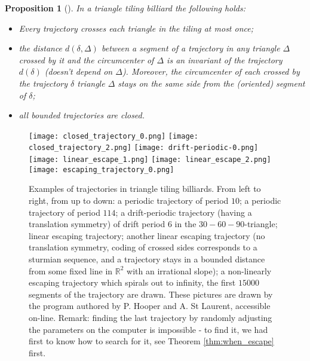 \documentclass[12pt]{article}
\newtheorem{proposition}{Proposition}
\theoremstyle{definition}
\begin{document}
\begin{proposition}[\cite{BDFI18}]\label{prop:Dianacomeback}
In a triangle tiling billiard the following holds:
\begin{itemize}
\item[1.] Every trajectory crosses each triangle in the tiling at most once;
\item[2.] the distance $d(\delta, \Delta)$ between a segment of a trajectory in any triangle $\Delta$ crossed by it and the circumcenter of $\Delta$ is an invariant of the trajectory $d(\delta)$ (doesn't depend on $\Delta$). Moreover, the circumcenter of each crossed by the trajectory $\delta$ triangle $\Delta$ stays on the same side from the (oriented) segment of $\delta$;
\item[3.] all bounded trajectories are closed.
\end{itemize}
\end{proposition}

\begin{figure}
\centering
\texttt{[image: closed\_trajectory\_0.png]}
\texttt{[image: closed\_trajectory\_2.png]}
\texttt{[image: drift-periodic-0.png]}
\texttt{[image: linear\_escape\_1.png]}
\texttt{[image: linear\_escape\_2.png]}
\texttt{[image: escaping\_trajectory\_0.png]}
\caption[]{Examples of trajectories in triangle tiling billiards. From left to right, from up to down: a periodic trajectory of period $10$; a periodic trajectory of period $114$; a drift-periodic trajectory (having a translation symmetry) of drift period $6$ in the $30-60-90$-triangle; linear escaping trajectory; another linear escaping trajectory (no translation symmetry, coding of crossed sides corresponds to a sturmian sequence, and a trajectory stays in a bounded distance from some fixed line in $\mathbb{R}^2$ with an irrational slope); a non-linearly escaping trajectory which spirals out to infinity, the first $15000$ segments of the trajectory are drawn. These pictures are drawn by the program \cite{HSL} authored by P. Hooper and A. St Laurent, accessible on-line. Remark: finding the last trajectory by randomly adjusting the parameters on the computer is impossible - to find it, we had first to know how to search for it, see Theorem \ref{thm:when_escape} first.}\label{figure: different behaviors}
\end{figure}
\end{document}
